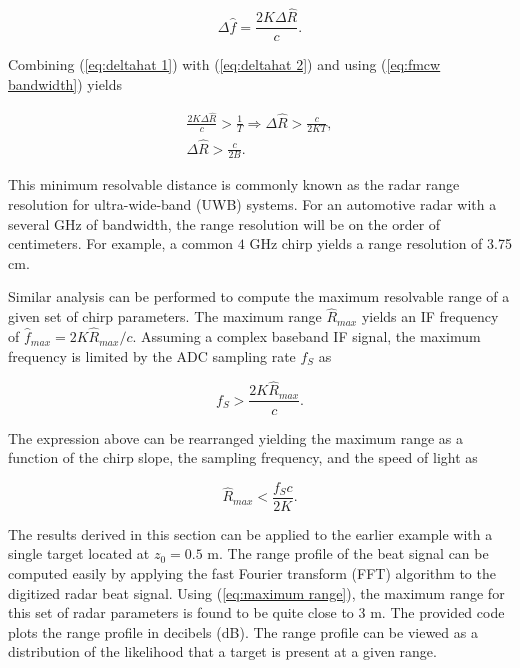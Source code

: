 \begin{equation}
	\label{eq:deltahat 2}
	\Delta \hat{f} = \frac{2K \Delta \hat{R}}{c}.
\end{equation}

Combining (\ref{eq:deltahat 1}) with (\ref{eq:deltahat 2}) and using (\ref{eq:fmcw bandwidth}) yields

\begin{gather}
	\frac{2K \Delta \hat{R}}{c} > \frac{1}{T} \Rightarrow \Delta \hat{R} > \frac{c}{2KT}, \\
	\Delta \hat{R} > \frac{c}{2B}.
	\label{eq:range resolution}
\end{gather}

This minimum resolvable distance is commonly known as the radar range resolution for ultra-wide-band (UWB) systems. For an automotive radar with a several GHz of bandwidth, the range resolution will be on the order of centimeters. For example, a common $4$ GHz chirp yields a range resolution of 3.75 cm. 

Similar analysis can be performed to compute the maximum resolvable range of a given set of chirp parameters. The maximum range $\hat{R}_{max}$ yields an IF frequency of $\hat{f}_{max} = 2K\hat{R}_{max}/c$. Assuming a complex baseband IF signal, the maximum frequency is limited by the ADC sampling rate $f_S$ as

\begin{equation}
	f_S > \frac{2K\hat{R}_{max}}{c}.
\end{equation}

The expression above can be rearranged yielding the maximum range as a function of the chirp slope, the sampling frequency, and the speed of light as

\begin{equation}
	\hat{R}_{max} < \frac{f_S c}{2K}.
	\label{eq:maximum range}
\end{equation}

The results derived in this section can be applied to the earlier example with a single target located at $z_0 = 0.5$ m. The range profile of the beat signal can be computed easily by applying the fast Fourier transform (FFT) algorithm to the digitized radar beat signal. Using (\ref{eq:maximum range}), the maximum range for this set of radar parameters is found to be quite close to $3$ m. The provided code plots the range profile in decibels (dB). The range profile can be viewed as a distribution of the likelihood that a target is present at a given range.


